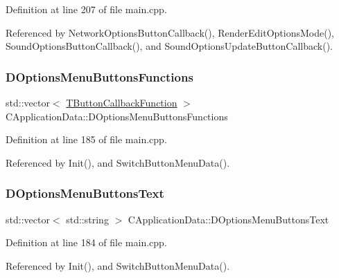 Definition at line 207 of file main.\+cpp.



Referenced by Network\+Options\+Button\+Callback(), Render\+Edit\+Options\+Mode(), Sound\+Options\+Button\+Callback(), and Sound\+Options\+Update\+Button\+Callback().

\hypertarget{classCApplicationData_a4c9516d20be17a9c9d5c1119736037e5}{}\label{classCApplicationData_a4c9516d20be17a9c9d5c1119736037e5} 
\subsubsection{\texorpdfstring{D\+Options\+Menu\+Buttons\+Functions}{DOptionsMenuButtonsFunctions}}
{\footnotesize\ttfamily std\+::vector$<$ \hyperlink{main_8cpp_af91bc223ea3fea871af009bfef33c595}{T\+Button\+Callback\+Function} $>$ C\+Application\+Data\+::\+D\+Options\+Menu\+Buttons\+Functions\hspace{0.3cm}{\ttfamily [protected]}}



Definition at line 185 of file main.\+cpp.



Referenced by Init(), and Switch\+Button\+Menu\+Data().

\hypertarget{classCApplicationData_aa9201da5408887973cb56fb1671ad6f8}{}\label{classCApplicationData_aa9201da5408887973cb56fb1671ad6f8} 
\subsubsection{\texorpdfstring{D\+Options\+Menu\+Buttons\+Text}{DOptionsMenuButtonsText}}
{\footnotesize\ttfamily std\+::vector$<$ std\+::string $>$ C\+Application\+Data\+::\+D\+Options\+Menu\+Buttons\+Text\hspace{0.3cm}{\ttfamily [protected]}}



Definition at line 184 of file main.\+cpp.



Referenced by Init(), and Switch\+Button\+Menu\+Data().

